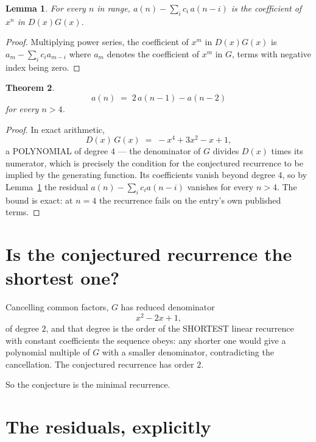 \documentclass[11pt,a4paper]{article}
\theoremstyle{plain}
\newtheorem{theorem}{Theorem}
\newtheorem{lemma}[theorem]{Lemma}
\theoremstyle{definition}
\begin{document}
\begin{lemma}\label{lem:key}
For every $n$ in range, $a(n)-\sum_i c_i\,a(n-i)$ is the coefficient of $x^{n}$ in
$D(x)G(x)$.
\end{lemma}

\begin{proof}
Multiplying power series, the coefficient of $x^{m}$ in $D(x)G(x)$ is
$a_m-\sum_i c_i a_{m-i}$ where $a_m$ denotes the coefficient of $x^{m}$ in $G$, terms with
negative index being zero.
\end{proof}

\begin{theorem}
\[
a(n)\;=\;2\,a(n-1) - a(n-2)
\]
for every $n>4$.
\end{theorem}

\begin{proof}
In exact arithmetic,
\[
D(x)\,G(x)\;=\;- x^{4} + 3 x^{2} - x + 1,
\]
a POLYNOMIAL of degree $4$ --- the denominator of $G$ divides $D(x)$ times its numerator,
which is precisely the condition for the conjectured recurrence to be implied by the
generating function. Its coefficients vanish beyond degree $4$, so by
Lemma~\ref{lem:key} the residual $a(n)-\sum_ic_ia(n-i)$ vanishes for every
$n>4$. The bound is exact: at $n=4$ the recurrence fails on the entry's own published terms.
\end{proof}

\section{Is the conjectured recurrence the shortest one?}

Cancelling common factors, $G$ has reduced denominator
\[
x^{2} - 2 x + 1,
\]
of degree $2$, and that degree is the order of the SHORTEST linear recurrence with
constant coefficients the sequence obeys: any shorter one would give a polynomial multiple of
$G$ with a smaller denominator, contradicting the cancellation. The conjectured recurrence has
order $2$.

So the conjecture is the minimal recurrence.

\section{The residuals, explicitly}
\end{document}
